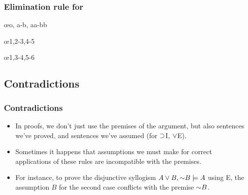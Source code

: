 \begin{frame}
  \frametitle{Elimination rule for \eor}
  \begin{fitchproof}
    \open
    \ellipsesline
    \close
    \open
    \ellipsesline
    \close
     \oe{o, a-b, aa-bb}
  \end{fitchproof}
\end{frame}


\begin{frame}
  \begin{fitchproof}
    \open
    \close
    \open
    \close
    \oe{1,2-3,4-5}
  \end{fitchproof}
\end{frame}

\begin{frame}
  \begin{fitchproof}
    \open
    \close
    \open
    \close
    \oe{1,3-4,5-6}
  \end{fitchproof}
\end{frame}

\subsection{Contradictions}

\begin{frame}
  \frametitle{Contradictions}

  \begin{itemize}[<+->]
  \item In proofs, we don't just use the premises of the argument, but also
  sentences we've proved, and sentences we've assumed (for $\supset$I,
  $\vee$E).

  \item Sometimes it happens that assumptions we must make for correct
  applications of these rules are incompatible with the premises.

  \item For instance, to prove the disjunctive syllogism $A \eor B,
  \enot B \models A$ using \eor E, the assumption $B$ for the second
  case conflicts with the premise $\enot B$.
  \end{itemize}
\end{frame}

